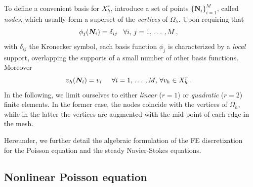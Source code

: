 \documentclass[12pt, a4paper, twoside, openright]{report}
\numberwithin{equation}{chapter}
\theoremstyle{theorem}
\theoremstyle{definition}
\theoremstyle{remark}
\theoremstyle{proposition}
\numberwithin{figure}{chapter}
\newcommand{\bg}[1]{\boldsymbol{#1}}
\begin{document}
		To define a convenient basis for $X_h^r$, introduce a set of points $\big\lbrace \bg{N}_i \big\rbrace_{i = 1}^M$, called \emph{nodes}, which usually form a superset of the \emph{vertices} of $\Omega_h$. Upon requiring that
		\begin{equation*}
			\phi_j(\bg{N}_i) = \delta_{ij} \hspace*{0.3cm} \forall i, \, j = 1, \, \ldots \, , M \, ,
		\end{equation*}
		with $\delta_{ij}$ the Kronecker symbol, each basis function $\phi_j$ is characterized by a \emph{local} support, overlapping the supports of a small number of other basis functions. Moreover
		\begin{equation*}
			v_h(\bg{N}_i) = v_i \hspace*{0.5cm} \forall i = 1, \, \ldots \, , M, \, \forall v_h \in X_h^r \, .
		\end{equation*}
		In the following, we limit ourselves to either \emph{linear} ($r = 1$) or \emph{quadratic} ($r = 2$) finite elements. In the former case, the nodes coincide with the vertices of $\Omega_h$, while in the latter the vertices are augmented with the mid-point of each edge in the mesh. 
		
		Hereunder, we further detail the algebraic formulation of the FE discretization for the Poisson equation and the steady Navier-Stokes equations.
		
	\vspace*{0.3cm}
		 
	\subsection{Nonlinear Poisson equation}
	\label{section:Nonlinear Poisson equation (FE)}
	
\end{document}
